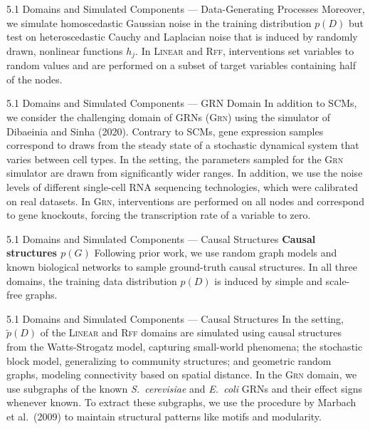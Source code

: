 \documentclass[aspectratio=169,10pt]{beamer}
\newcommand{\domain}[1]{\textsc{#1}}
\newcommand{\lineardomain}{\domain{Linear}\xspace}
\newcommand{\rffdomain}{\domain{Rff}\xspace}
\newcommand{\grndomain}{\domain{Grn}\xspace}
\newcommand{\ood}{\text{o.o.d.}\xspace}
\newcommand{\ecoli}{{\em E.\ coli}\xspace}
\newcommand{\yeast}{{\em S.\ cerevisiae}\xspace}
\newcommand\erdosrenyi{\text{Erd{\H{o}}s-R{\'e}nyi}\xspace}
\begin{document}
\begin{frame}{5.1 Domains and Simulated Components --- Data-Generating Processes}
Moreover, we simulate homoscedastic Gaussian noise in the training distribution $p(D)$ but test on heteroscedastic Cauchy and Laplacian noise \ood that is induced by randomly drawn, nonlinear functions $h_j$. In \lineardomain and \rffdomain, interventions set variables to random values and are performed on a subset of target variables containing half of the nodes.
\end{frame}

\begin{frame}{5.1 Domains and Simulated Components --- GRN Domain}
In addition to SCMs, we consider the challenging domain of GRNs (\grndomain) using the simulator of Dibaeinia and Sinha (2020). Contrary to SCMs, gene expression samples correspond to draws from the steady state of a stochastic dynamical system that varies between cell types. In the \ood setting, the parameters sampled for the \grndomain simulator are drawn from significantly wider ranges. In addition, we use the noise levels of different single-cell RNA sequencing technologies, which were calibrated on real datasets. In \grndomain, interventions are performed on all nodes and correspond to gene knockouts, forcing the transcription rate of a variable to zero.
\end{frame}

\begin{frame}{5.1 Domains and Simulated Components --- Causal Structures}
\textbf{Causal structures $p(G)$}\quad
Following prior work, we use random graph models and known biological networks to sample ground-truth causal structures. In all three domains, the training data distribution $p(D)$ is induced by simple \erdosrenyi and scale-free graphs.
\end{frame}

\begin{frame}{5.1 Domains and Simulated Components --- Causal Structures}
\small
In the \ood setting, $\tilde{p}(D)$ of the \lineardomain and \rffdomain domains are simulated using causal structures from the Watts-Strogatz model, capturing small-world phenomena; the stochastic block model, generalizing \erdosrenyi to community structures; and geometric random graphs, modeling connectivity based on spatial distance. In the \grndomain domain, we use subgraphs of the known \yeast and \ecoli GRNs and their effect signs whenever known. To extract these subgraphs, we use the procedure by Marbach et al.\ (2009) to maintain structural patterns like motifs and modularity.
\end{frame}
\end{document}
